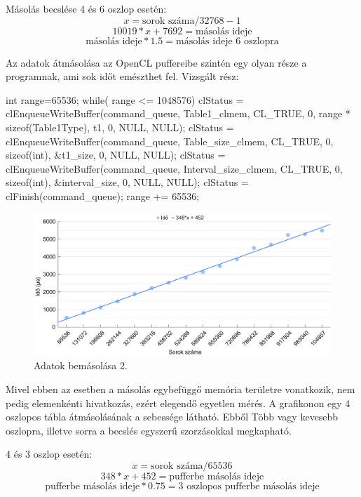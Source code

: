 Másolás becslése 4 és 6 oszlop esetén:
$$ x = \text{sorok száma}/32768 - 1 $$
$$ 10019 * x + 7692 = \text{másolás ideje}$$
$$ \text{másolás ideje} * 1.5 = \text{másolás ideje 6 oszlopra} $$


Az adatok átmásolása az OpenCL puffereibe szintén egy olyan része a programnak, ami sok időt emészthet fel.
Vizsgált rész:

\begin{python}
int range=65536;
while( range <= 1048576){
 clStatus = clEnqueueWriteBuffer(command_queue, Table1_clmem,
  CL_TRUE, 0, range * sizeof(Table1Type), t1, 0, NULL, NULL);
 clStatus = clEnqueueWriteBuffer(command_queue, Table_size_clmem,
  CL_TRUE, 0, sizeof(int), &t1_size, 0, NULL, NULL);
 clStatus = clEnqueueWriteBuffer(command_queue, Interval_size_clmem,
  CL_TRUE, 0, sizeof(int), &interval_size, 0, NULL, NULL);
 clStatus = clFinish(command_queue);
	range += 65536;
}
\end{python}

\begin{figure}[h!]
\centering
\includegraphics[width=\textwidth]{images/graph/pufferin.png}
\caption{Adatok bemásolása 2.}
\label{fig:schema}
\end{figure}

Mivel ebben az esetben a másolás egybefüggő memória területre vonatkozik, nem pedig elemenkénti hivatkozás, ezért elegendő egyetlen mérés.
A grafikonon egy 4 oszlopos tábla átmásolásának a sebessége látható. Ebből Több vagy kevesebb oszlopra, illetve sorra a becslés egyszerű szorzásokkal megkapható.

4 és 3 oszlop esetén:
$$ x = \text{sorok száma} / 65536 $$
$$ 348*x + 452 = \text{pufferbe másolás ideje} $$ 
$$ \text{pufferbe másolás ideje} * 0.75 = \text{3 oszlopos pufferbe másolás ideje}  $$


